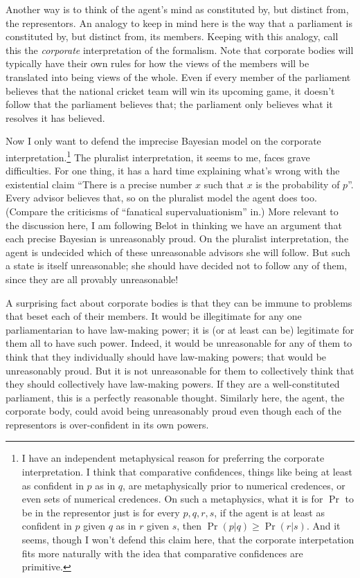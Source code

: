 \documentclass{ergoclass}
\begin{document}
Another way is to think of the agent's mind as constituted by, but distinct from, the representors. An analogy to keep in mind here is the way that a parliament is constituted by, but distinct from, its members. Keeping with this analogy, call this the \textit{corporate} interpretation of the formalism. Note that corporate bodies will typically have their own rules for how the views of the members will be translated into being views of the whole. Even if every member of the parliament believes that the national cricket team will win its upcoming game, it doesn't follow that the parliament believes that; the parliament only believes what it resolves it has believed.

Now I only want to defend the imprecise Bayesian model on the corporate interpretation.\footnote{\label{Corporate}I have an independent metaphysical reason for preferring the corporate interpretation. I think that comparative confidences, things like being at least as confident in $p$ as in $q$, are metaphysically prior to numerical credences, or even sets of numerical credences. On such a metaphysics, what it is for $\Pr$ to be in the representor just is for every $p, q, r, s$, if the agent is at least as confident in $p$ given $q$ as in $r$ given $s$, then $\Pr(p | q) \geq \Pr(r | s)$. And it seems, though I won't defend this claim here, that the corporate interpetation fits more naturally with the idea that comparative confidences are primitive.} The pluralist interpretation, it seems to me, faces grave difficulties. For one thing, it has a hard time explaining what's wrong with the existential claim ``There is a precise number $x$ such that $x$ is the probability of $p$''. Every advisor believes that, so on the pluralist model the agent does too. (Compare the criticisms of ``fanatical supervaluationism'' in\citealt{Lewis1993c}.) %
More relevant to the discussion here, I am following Belot in thinking we have an argument that each precise Bayesian is unreasonably proud. On the pluralist interpretation, the agent is undecided which of these unreasonable advisors she will follow. But such a state is itself unreasonable; she should have decided not to follow any of them, since they are all provably unreasonable!

A surprising fact about corporate bodies is that they can be immune to problems that beset each of their members. It would be illegitimate for any one parliamentarian to have law-making power; it is (or at least can be) legitimate for them all to have such power. Indeed, it would be unreasonable for any of them to think that they individually should have law-making powers; that would be unreasonably proud. But it is not unreasonable for them to collectively think that they should collectively have law-making powers. If they are a well-constituted parliament, this is a perfectly reasonable thought. Similarly here, the agent, the corporate body, could avoid being unreasonably proud even though each of the representors is over-confident in its own powers.
\end{document}
